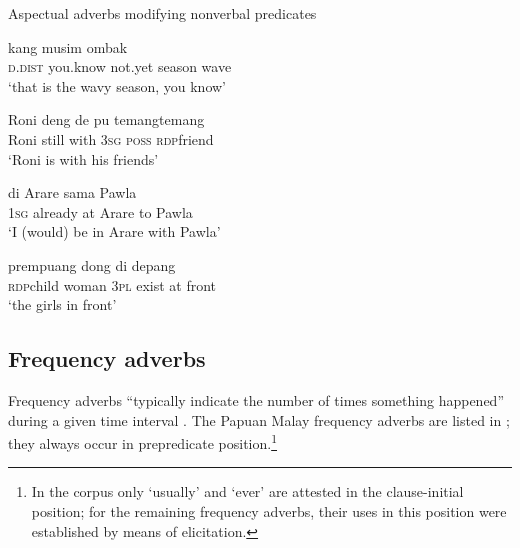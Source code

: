 \begin{styleExampleTitle}
Aspectual adverbs modifying nonverbal predicates
\end{styleExampleTitle}

\ea
\label{Example_5.145}
 {kang} {} {musim} {ombak}\\ %
 \textsc{d.dist}  you.know  not.yet  season  wave\\
 ‘that is  the wavy season, you know’ \textstyleExampleSource{[080927-003-Cv.0020]}
\z

\ea
\label{Example_5.146}
\gll  Roni    deng  de  pu  temang{\Tilde}temang\\
 Roni  still  with  \textsc{3sg}  \textsc{poss}  \textsc{rdp}{\Tilde}friend\\
\glt 
‘Roni is  with his friends’ \textstyleExampleSource{[081006-031-Cv.0011]}
\z

\ea
\label{Example_5.147}
 {} {di} {Arare} {sama} {Pawla}\\ %
 \textsc{1sg}  already  at  Arare  to  Pawla\\
\glt 
‘I (would)  be in Arare with Pawla’ \textstyleExampleSource{[081025-009a-Cv.0110]}
\z

\ea
\label{Example_5.148}
 {prempuang} {dong} {} {di} {depang}\\ %
 \textsc{rdp}{\Tilde}child  woman  3\textsc{pl}  exist  at  front\\
\glt
‘the girls  in front’ \textstyleExampleSource{[080921-004a-CvNP.0066]}
\z


\subsection{Frequency adverbs}
\label{Para_5.4.2}
Frequency adverbs “typically indicate the number of times something happened” during a given time interval \citep[688]{Doetjes.2007}. The Papuan Malay frequency adverbs are listed in  ; they always occur in prepredicate position.\footnote{In the corpus only  ‘usually’ and  ‘ever’ are attested in the clause-initial position; for the remaining frequency adverbs, their uses in this position were established by means of elicitation.}


